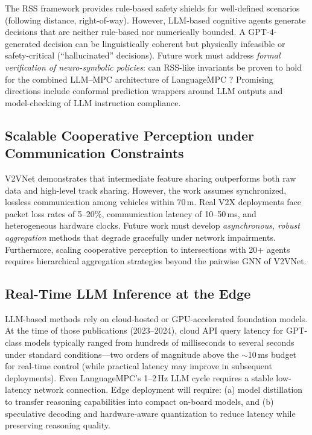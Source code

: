 \documentclass[12pt, a4paper]{article}
\begin{document}
The RSS framework \citep{shalev2016safe} provides rule-based safety shields for
well-defined scenarios (following distance, right-of-way). However, LLM-based
cognitive agents generate decisions that are neither rule-based nor numerically
bounded. A GPT-4-generated decision can be linguistically coherent but physically
infeasible or safety-critical (``hallucinated'' decisions). Future work must
address \emph{formal verification of neuro-symbolic policies}: can RSS-like
invariants be proven to hold for the combined LLM--MPC architecture of
LanguageMPC \citep{sha2023languagempc}? Promising directions include conformal
prediction wrappers around LLM outputs and model-checking of LLM instruction
compliance.

\subsection{Scalable Cooperative Perception under Communication Constraints}
\label{sec:coop}

V2VNet \citep{wang2020v2vnet} demonstrates that intermediate feature sharing
outperforms both raw data and high-level track sharing. However, the work assumes
synchronized, lossless communication among vehicles within 70\,m. Real V2X
deployments face packet loss rates of 5--20\%, communication latency of 10--50\,ms,
and heterogeneous hardware clocks. Future work must develop \emph{asynchronous,
robust aggregation} methods that degrade gracefully under network impairments.
Furthermore, scaling cooperative perception to intersections with 20+ agents
requires hierarchical aggregation strategies beyond the pairwise GNN of V2VNet.

\subsection{Real-Time LLM Inference at the Edge}
\label{sec:latency}

LLM-based methods \citep{fu2023drive, wen2023dilu, mao2023gpt, sha2023languagempc}
rely on cloud-hosted or GPU-accelerated foundation models. At the time of those
publications (2023--2024), cloud API query latency for GPT-class models
typically ranged from hundreds of milliseconds to several seconds under standard
conditions---two orders of magnitude above the $\sim$10\,ms budget for real-time
control (while practical latency may improve in subsequent deployments). Even
LanguageMPC's 1--2\,Hz LLM cycle requires a stable low-latency network
connection. Edge deployment will
require: (a) model distillation \citep{kiran2021deep} to transfer reasoning
capabilities into compact on-board models, and (b) speculative decoding and
hardware-aware quantization to reduce latency while preserving reasoning quality.
\end{document}
